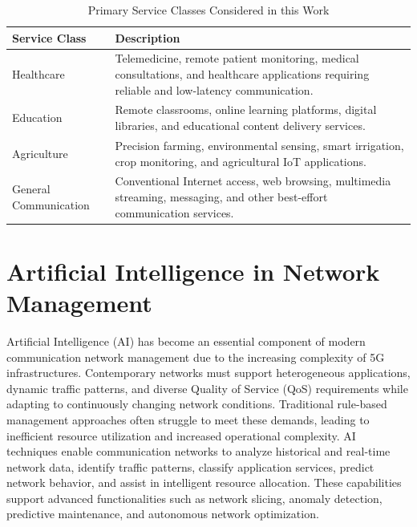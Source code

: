 \documentclass[12pt,a4paper]{report}
\begin{document}
	\begin{table}[H]
		\centering
		\caption{Primary Service Classes Considered in this Work}
		\label{tab:services}
		
		\begin{tabular}{|p{4cm}|p{9cm}|}
			\hline
			
			\textbf{Service Class} &
			\textbf{Description}
			\\
			\hline
			
			Healthcare &
			Telemedicine, remote patient monitoring, medical consultations, and healthcare applications requiring reliable and low-latency communication.
			\\
			\hline
			
			Education &
			Remote classrooms, online learning platforms, digital libraries, and educational content delivery services.
			\\
			\hline
			
			Agriculture &
			Precision farming, environmental sensing, smart irrigation, crop monitoring, and agricultural IoT applications.
			\\
			\hline
			
			General Communication &
			Conventional Internet access, web browsing, multimedia streaming, messaging, and other best-effort communication services.
			\\
			\hline
			
		\end{tabular}
		
	\end{table}
	
	\section{Artificial Intelligence in Network Management}
	\label{sec:ai}
	
	Artificial Intelligence (AI) has become an essential component of modern communication network management due to the increasing complexity of 5G infrastructures. Contemporary networks must support heterogeneous applications, dynamic traffic patterns, and diverse Quality of Service (QoS) requirements while adapting to continuously changing network conditions. Traditional rule-based management approaches often struggle to meet these demands, leading to inefficient resource utilization and increased operational complexity. AI techniques enable communication networks to analyze historical and real-time network data, identify traffic patterns, classify application services, predict network behavior, and assist in intelligent resource allocation. These capabilities support advanced functionalities such as network slicing, anomaly detection, predictive maintenance, and autonomous network optimization.
	
\end{document}
